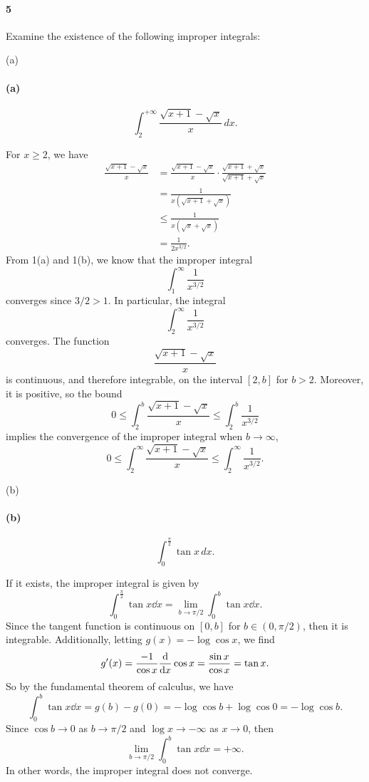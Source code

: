 \documentclass[12pt]{article}
\newenvironment{fullbox}{\begin{lrbox}{\savefullbox}\begin{minipage}{\dimexpr\textwidth-2\fboxsep\relax}}{\end{minipage}\end{lrbox}\begin{center}\framebox[\textwidth]{\usebox{\savefullbox}}\end{center}}
\newenvironment{pbox}[1][]{\begin{fullbox}\ifx#1\empty\else\paragraph{#1}\fi}{\end{fullbox}}
\theoremstyle{definition}
\begin{document}
\newpage
\begin{pbox}[5]
    Examine the existence of the following improper integrals:
\end{pbox}

\begin{pbox}[(a)]
    \begin{equation}
    \int_2^{+\infty} \frac{\sqrt{x+1}-\sqrt{x}}{x}\,dx.
    \end{equation}
\end{pbox}

For $x \geq 2$, we have
\begin{align*}
    \frac{\sqrt{x+1}-\sqrt{x}}{x}
        &= \frac{\sqrt{x+1}-\sqrt{x}}{x} \cdot \frac{\sqrt{x+1} + \sqrt{x}}{\sqrt{x+1} + \sqrt{x}} \\
        &= \frac{1}{x(\sqrt{x+1} + \sqrt{x})} \\
        &\leq \frac{1}{x(\sqrt{x} + \sqrt{x})} \\
        &= \frac{1}{2x^{3/2}}.
\end{align*}
From 1(a) and 1(b), we know that the improper integral
\[
    \int_{1}^{\infty} \frac{1}{x^{3/2}}
\]
converges since $3/2 > 1$. In particular, the integral
\[
    \int_{2}^{\infty} \frac{1}{x^{3/2}}
\]
converges. The function
\[
    \frac{\sqrt{x+1}-\sqrt{x}}{x}
\]
is continuous, and therefore integrable, on the interval $[2, b]$ for $b > 2$. Moreover, it is positive, so the bound
\[
    0 \leq \int_{2}^{b}\frac{\sqrt{x+1}-\sqrt{x}}{x} \leq \int_{2}^{b} \frac{1}{x^{3/2}}
\]
implies the convergence of the improper integral when $b \to \infty$,
\[
    0 \leq \int_{2}^{\infty} \frac{\sqrt{x+1}-\sqrt{x}}{x}
        \leq \int_{2}^{\infty} \frac{1}{x^{3/2}}.
\]


\newpage
\begin{pbox}[(b)]
    \begin{equation}
    \int_0^{\frac{\pi}{2}} \tan x\,dx.
    \end{equation}
\end{pbox}

If it exists, the improper integral is given by
\[
    \int_0^{\frac{\pi}{2}} \tan x \dd{x}
        = \lim_{b \to \pi/2} \int_0^{b} \tan x \dd{x}.
\]
Since the tangent function is continuous on $[0, b]$ for $b \in (0, \pi/2)$, then it is integrable. Additionally, letting $g(x) = -\log \cos x$, we find
\[
    g'(x) 
        = \frac{-1}{\cos x} \dv{x} \cos x
        = \frac{\sin x}{\cos x}
        = \tan x.
\]
So by the fundamental theorem of calculus, we have
\[
    \int_0^{b} \tan x \dd{x}
        = g(b) - g(0)
        = -\log\cos b + \log\cos 0
        = -\log\cos b.
\]
Since $\cos b \to 0$ as $b \to \pi/2$ and $\log x \to -\infty$ as $x \to 0$, then
\[
    \lim_{b \to \pi/2} \int_0^{b} \tan x \dd{x} = +\infty.
\]
In other words, the improper integral does not converge.
\end{document}
